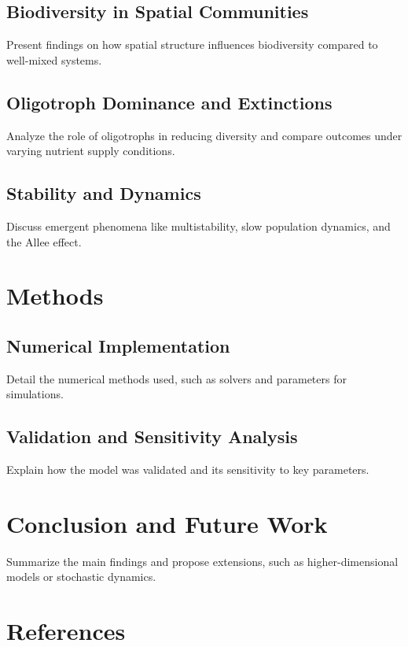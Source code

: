 \documentclass[a4paper,11pt]{article}
\begin{document}
\subsection{Biodiversity in Spatial Communities}
Present findings on how spatial structure influences biodiversity compared to well-mixed systems.

\subsection{Oligotroph Dominance and Extinctions}
Analyze the role of oligotrophs in reducing diversity and compare outcomes under varying nutrient supply conditions.

\subsection{Stability and Dynamics}
Discuss emergent phenomena like multistability, slow population dynamics, and the Allee effect.

\section{Methods}
\subsection{Numerical Implementation}
Detail the numerical methods used, such as solvers and parameters for simulations.

\subsection{Validation and Sensitivity Analysis}
Explain how the model was validated and its sensitivity to key parameters.

\section{Conclusion and Future Work}
Summarize the main findings and propose extensions, such as higher-dimensional models or stochastic dynamics.

\section*{References}

\end{document}
